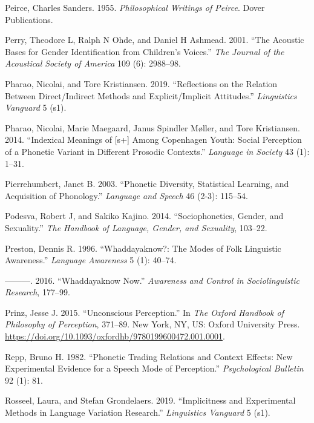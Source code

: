 \documentclass[
  letterpaper,
  DIV=11,
  numbers=noendperiod]{scrartcl}
\newlength{\cslhangindent}
\newenvironment{CSLReferences}[2] %
 {\begin{list}{}{%
  \setlength{\itemindent}{0pt}
  \setlength{\leftmargin}{0pt}
  \setlength{\parsep}{0pt}
  \ifodd #1
   \setlength{\leftmargin}{\cslhangindent}
   \setlength{\itemindent}{-1\cslhangindent}
  \fi
  \setlength{\itemsep}{#2\baselineskip}}}
 {\end{list}}
\begin{document}
\begin{CSLReferences}{1}{0}
Peirce, Charles Sanders. 1955. \emph{Philosophical Writings of Peirce}.
Dover Publications.

Perry, Theodore L, Ralph N Ohde, and Daniel H Ashmead. 2001. {``The
Acoustic Bases for Gender Identification from Children's Voices.''}
\emph{The Journal of the Acoustical Society of America} 109 (6):
2988--98.

Pharao, Nicolai, and Tore Kristiansen. 2019. {``Reflections on the
Relation Between Direct/Indirect Methods and Explicit/Implicit
Attitudes.''} \emph{Linguistics Vanguard} 5 (s1).

Pharao, Nicolai, Marie Maegaard, Janus Spindler Møller, and Tore
Kristiansen. 2014. {``Indexical Meanings of {[}s+{]} Among Copenhagen
Youth: Social Perception of a Phonetic Variant in Different Prosodic
Contexts.''} \emph{Language in Society} 43 (1): 1--31.

Pierrehumbert, Janet B. 2003. {``Phonetic Diversity, Statistical
Learning, and Acquisition of Phonology.''} \emph{Language and Speech} 46
(2-3): 115--54.

Podesva, Robert J, and Sakiko Kajino. 2014. {``Sociophonetics, Gender,
and Sexuality.''} \emph{The Handbook of Language, Gender, and
Sexuality}, 103--22.

Preston, Dennis R. 1996. {``Whaddayaknow?: The Modes of Folk Linguistic
Awareness.''} \emph{Language Awareness} 5 (1): 40--74.

---------. 2016. {``Whaddayaknow Now.''} \emph{Awareness and Control in
Sociolinguistic Research}, 177--99.

Prinz, Jesse J. 2015. {``Unconscious Perception.''} In \emph{The
{Oxford} Handbook of Philosophy of Perception}, 371--89. New York, NY,
US: Oxford University Press.
\url{https://doi.org/10.1093/oxfordhb/9780199600472.001.0001}.

Repp, Bruno H. 1982. {``Phonetic Trading Relations and Context Effects:
New Experimental Evidence for a Speech Mode of Perception.''}
\emph{Psychological Bulletin} 92 (1): 81.

Rosseel, Laura, and Stefan Grondelaers. 2019. {``Implicitness and
Experimental Methods in Language Variation Research.''}
\emph{Linguistics Vanguard} 5 (s1).


\end{CSLReferences}
\end{document}
